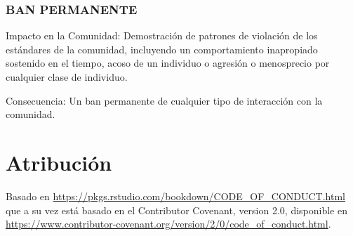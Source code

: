 \documentclass[
]{book}
\begin{document}
\hypertarget{ban-permanente}{%
\subsubsection{BAN PERMANENTE}\label{ban-permanente}}

Impacto en la Comunidad: Demostración de patrones de violación de los estándares de la comunidad, incluyendo un comportamiento inapropiado sostenido en el tiempo, acoso de un individuo o agresión o menosprecio por cualquier clase de individuo.

Consecuencia: Un ban permanente de cualquier tipo de interacción con la comunidad.

\hypertarget{atribuciuxf3n}{%
\section{Atribución}\label{atribuciuxf3n}}

Basado en \url{https://pkgs.rstudio.com/bookdown/CODE_OF_CONDUCT.html} que a su vez está basado en el Contributor Covenant, version 2.0, disponible en \url{https://www.contributor-covenant.org/version/2/0/code_of_conduct.html}.

  
\end{document}
